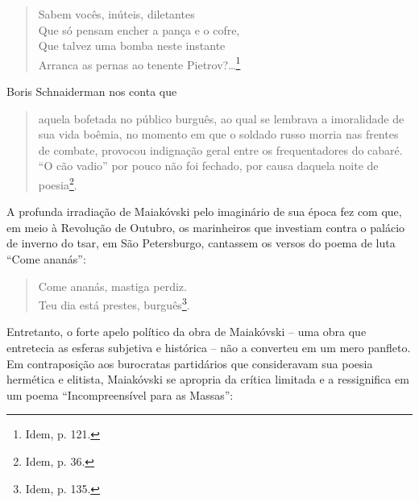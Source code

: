 \begin{verse}
Sabem vocês, inúteis, diletantes\\
Que só pensam encher a pança e o cofre,\\
Que talvez uma bomba neste instante\\
Arranca as pernas ao tenente Pietrov?\ldots{}\footnote{Idem, p. 121.}
\end{verse}

Boris Schnaiderman nos conta que

\begin{quote}
aquela bofetada no público burguês, ao qual se lembrava a imoralidade de
sua vida boêmia, no momento em que o soldado russo morria nas frentes de
combate, provocou indignação geral entre os frequentadores do cabaré.
``O cão vadio'' por pouco não foi fechado, por causa daquela noite de
poesia\footnote{Idem, p. 36.}.
\end{quote}

A profunda irradiação de Maiakóvski pelo imaginário de sua época fez com
que, em meio à Revolução de Outubro, os marinheiros que investiam contra
o palácio de inverno do tsar, em São Petersburgo, cantassem os versos do
poema de luta ``Come ananás'':

\begin{verse}
Come ananás, mastiga perdiz.\\
Teu dia está prestes, burguês\footnote{Idem, p. 135.}.
\end{verse}

Entretanto, o forte apelo político da obra de Maiakóvski -- uma obra que
entretecia as esferas subjetiva e histórica -- não a converteu em um
mero panfleto. Em contraposição aos burocratas partidários que
consideravam sua poesia hermética e elitista, Maiakóvski se apropria da
crítica limitada e a ressignifica em um poema ``Incompreensível para as
Massas'':

